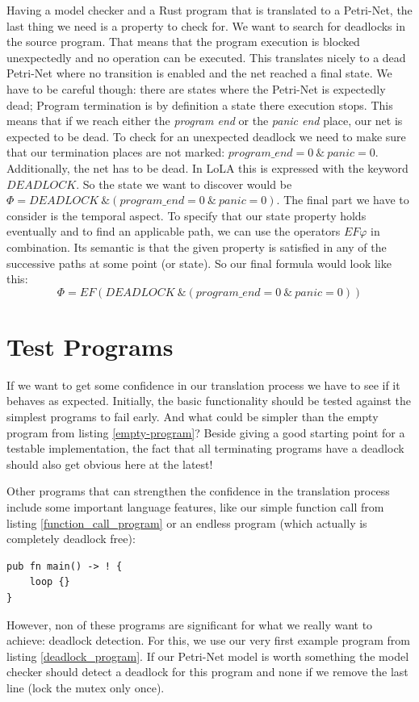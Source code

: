 Having a model checker and a Rust program that is translated to a Petri-Net, the last thing we need is a property to check for.
We want to search for deadlocks in the source program.
That means that the program execution is blocked unexpectedly and no operation can be executed.
This translates nicely to a dead Petri-Net where no transition is enabled and the net reached a final state.
We have to be careful though: there are states where the Petri-Net is expectedly dead;
Program termination is by definition a state there execution stops.
This means that if we reach either the \textit{program end} or the \textit{panic end} place, our net is expected to be dead.
To check for an unexpected deadlock we need to make sure that our termination places are not marked: $program\_end = 0\ \&\ panic = 0$.
Additionally, the net has to be dead.
In LoLA this is expressed with the keyword $DEADLOCK$.
So the state we want to discover would be $\Phi=DEADLOCK\ \& (program\_end = 0\ \&\ panic = 0)$.
The final part we have to consider is the temporal aspect.
To specify that our state property holds eventually and to find an applicable path, we can use the operators $EF\varphi$ in combination.
Its semantic is that the given property is satisfied in any of the successive paths at some point (or state).
So our final formula would look like this:
$$\Phi = EF(DEADLOCK\ \& (program\_end = 0\ \&\  panic = 0))$$

\section{Test Programs}
\label{app_test}
If we want to get some confidence in our translation process we have to see if it behaves as expected.
Initially, the basic functionality should be tested against the simplest programs to fail early.
And what could be simpler than the empty program from listing \ref{empty-program}?
Beside giving a good starting point for a testable implementation, the fact that all terminating programs have a deadlock should also get obvious here at the latest!

Other programs that can strengthen the confidence in the translation process include some important language features, like our simple function call from listing \ref{function_call_program} or an endless program (which actually is completely deadlock free):

\begin{lstlisting}
pub fn main() -> ! {
    loop {}
}
\end{lstlisting}
However, non of these programs are significant for what we really want to achieve: deadlock detection.
For this, we use our very first example program from listing \ref{deadlock_program}.
If our Petri-Net model is worth something the model checker should detect a deadlock for this program and none if we remove the last line (lock the mutex only once).

